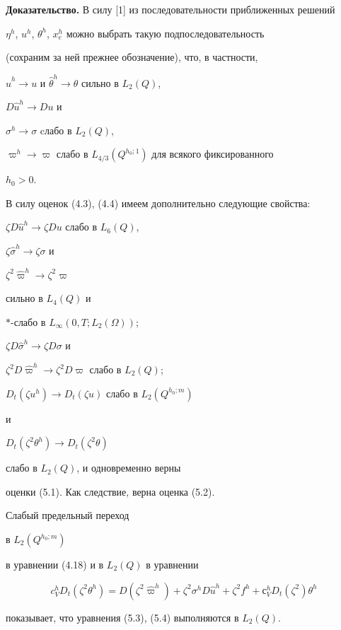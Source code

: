 {\bf Доказательство.} В силу [1] из последовательности приближенных решений


$\eta^h$, $u^h$, $\theta^h$, $x_e^h$ можно выбрать такую подпоследовательность


(сохраним за ней прежнее обозначение), что, в частности,


$\widehat u^h\to u$ и $\widehat\theta^h\to \theta$ сильно в $L_2(Q)$,


$D\widehat u^h\to Du$ и


$\sigma^h\to\sigma$ cлабо в $L_2(Q)$,


$\varpi^h\to \varpi$ слабо в $L_{4/3}(Q^{h_0;1})$ для всякого фиксированного


$h_0>0$.


В силу оценок (4.3), (4.4) имеем дополнительно следующие свойства:


$\zeta D\widehat u^h\to \zeta Du$ слабо в $L_6(Q)$,


$\zeta\widehat\sigma^h\to\zeta\sigma$ и


$\zeta^2\widehat\varpi^h\to\zeta^2\varpi$


сильно в $L_4(Q)$ и


$\ast$-слабо в $L_{\infty}(0,T;L_2(\Omega))$;


$\zeta D\widehat\sigma^h\to \zeta D\sigma$ и


$\zeta^2 D\widehat\varpi^h\to\zeta^2 D\varpi$ слабо в $L_2(Q)$;


$D_t(\zeta u^h)\to D_t(\zeta u)$ слабо в $L_2(Q^{h_0;m})$


и


$D_t(\zeta^2\theta^h)\to D_t(\zeta^2\theta)$


слабо в $L_2(Q)$, и одновременно верны


оценки (5.1). Как следствие, верна оценка (5.2).





Слабый предельный переход


в $L_2(Q^{h_0;m})$


в уравнении (4.18) и в $L_2(Q)$ в уравнении


$$


c_V^h D_t(\zeta^2\theta^h)=D(\zeta^2\widehat\varpi^h)+


\zeta^2\sigma^hD\widehat u^h+\zeta^2f^h+с_V^hD_t(\zeta^2)\theta^h


$$


показывает, что уравнения (5.3), (5.4) выполняются в $L_2(Q)$.





